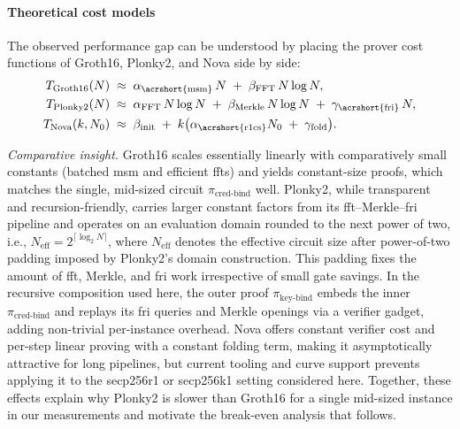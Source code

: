 \paragraph{Theoretical cost models}
The observed performance gap can be understood by placing the prover cost functions of Groth16, Plonky2, and Nova side by side:
\[
\begin{aligned}
	T_{\text{Groth16}}(N) &\;\approx\; \alpha_{\text{\acrshort{msm}}}\,N \;+\; \beta_{\text{FFT}}\,N\log N,\\
	T_{\text{Plonky2}}(N) &\;\approx\; \alpha_{\text{FFT}}\,N\log N \;+\; \beta_{\text{Merkle}}\,N\log N \;+\; \gamma_{\text{\acrshort{fri}}}\,N,\\
	T_{\text{Nova}}(k,N_0) &\;\approx\; \beta_{\text{init}} \;+\; k\big(\alpha_{\text{\acrshort{r1cs}}}N_0 \;+\; \gamma_{\text{fold}}\big).
\end{aligned}
\]

\emph{Comparative insight.}
Groth16 scales essentially linearly with comparatively small constants (batched \acrshort{msm} and efficient \acrshort{fft}s) and yields constant-size proofs, which matches the single, mid-sized circuit $\pi_{\text{cred-bind}}$ well. Plonky2, while transparent and recursion-friendly, carries larger constant factors from its \acrshort{fft}–Merkle–\acrshort{fri} pipeline and operates on an evaluation domain rounded to the next power of two, i.e., $N_{\mathrm{eff}}=2^{\lceil\log_2 N\rceil}$, where $N_{\mathrm{eff}}$ denotes the effective circuit size after power-of-two padding imposed by Plonky2’s domain construction. This padding fixes the amount of \acrshort{fft}, Merkle, and \acrshort{fri} work irrespective of small gate savings. In the recursive composition used here, the outer proof $\pi_{\text{key-bind}}$ embeds the inner $\pi_{\text{cred-bind}}$ and replays its \acrshort{fri} queries and Merkle openings via a verifier gadget, adding non-trivial per-instance overhead. Nova offers constant verifier cost and per-step linear proving with a constant folding term, making it asymptotically attractive for long pipelines, but current tooling and curve support prevents applying it to the secp256r1 or secp256k1 setting considered here. Together, these effects explain why Plonky2 is slower than Groth16 for a single mid-sized instance in our measurements and motivate the break-even analysis that follows.

